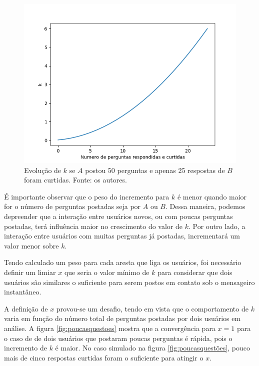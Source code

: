 \begin{figure}[!htb]
\centering
\includegraphics[width=14cm]{grafico_k2.png}
\caption{Evolução de $k$ se $A$ postou 50 perguntas e apenas 25 respostas de $B$ foram curtidas. Fonte: os autores.}
\label{fig:grafico_k2}
\end{figure}

É importante observar que o peso do incremento para $k$ é menor quando maior for o número de perguntas postadas seja por $A$ ou $B$. Dessa maneira, podemos depreender que a interação entre usuários novos, ou com poucas perguntas postadas, terá influência maior no crescimento do valor de $k$. Por outro lado, a interação entre usuários com muitas perguntas já postadas, incrementará um valor menor sobre $k$.

Tendo calculado um peso para cada aresta que liga os usuários, foi necessário definir um limiar $x$ que seria o valor mínimo de $k$ para considerar que dois usuários são similares o suficiente para serem postos em contato sob o mensageiro instantâneo.

A definição de $x$ provou-se um desafio, tendo em vista que o comportamento de $k$ varia em função do número total de perguntas postadas por dois usuários em análise. A figura \ref{fig:poucasquestoes} mostra que a convergência para $x = 1$ para o caso de de dois usuários que postaram poucas perguntas é rápida, pois o incremento de $k$ é maior. No caso simulado na figura \ref{fig:poucasquestões}, pouco mais de cinco respostas curtidas foram o suficiente para atingir o $x$.

